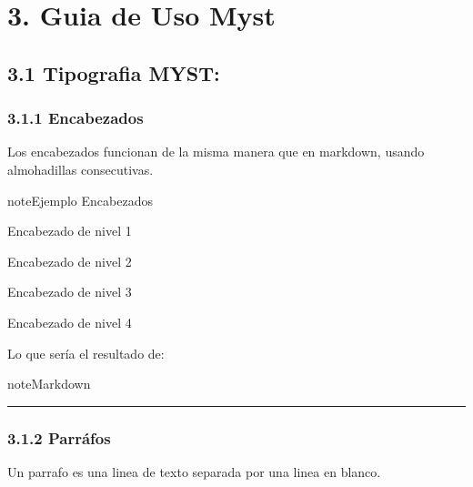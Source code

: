 \documentclass[a4paper,10pt,spanish]{sphinxmanual}
\begin{document}
\sphinxstepscope


\chapter{3. Guia de Uso Myst}
\label{\detokenize{3_guia_myst/index:guia-de-uso-myst}}\label{\detokenize{3_guia_myst/index::doc}}
\sphinxstepscope


\section{3.1 Tipografia MYST:}
\label{\detokenize{3_guia_myst/tipografia:tipografia-myst}}\label{\detokenize{3_guia_myst/tipografia::doc}}

\subsection{3.1.1 Encabezados}
\label{\detokenize{3_guia_myst/tipografia:encabezados}}
\sphinxAtStartPar
Los encabezados funcionan de la misma manera que en markdown, usando almohadillas consecutivas.

\begin{sphinxadmonition}{note}{Ejemplo Encabezados}

\sphinxAtStartPar
Encabezado de nivel 1

\sphinxAtStartPar
Encabezado de nivel 2

\sphinxAtStartPar
Encabezado de nivel 3

\sphinxAtStartPar
Encabezado de nivel 4
\end{sphinxadmonition}

\sphinxAtStartPar
Lo que sería el resultado de:

\begin{sphinxadmonition}{note}{Markdown}

\begin{sphinxVerbatim}[commandchars=\\\{\}]
\end{sphinxVerbatim}
\end{sphinxadmonition}


\bigskip\hrule\bigskip



\subsection{3.1.2 Parráfos}
\label{\detokenize{3_guia_myst/tipografia:parrafos}}
\sphinxAtStartPar
Un parrafo es una linea de texto separada por una linea en blanco.
\end{document}

